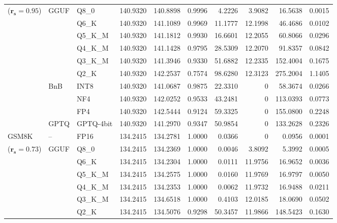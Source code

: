 \begin{table}[t]
{\begin{tabular}{ll l rrrrrrr}
{\small ($\mathbf{r_s{=}0.95}$)} & GGUF & Q8\_0 & 140.9320 & 140.8898 & 0.9996 & 4.2226 & 3.9082 & 16.5638 & 0.0015 \\
 &  & Q6\_K & 140.9320 & 141.1089 & 0.9969 & 11.1777 & 12.1998 & 46.4686 & 0.0102 \\
 &  & Q5\_K\_M & 140.9320 & 141.1812 & 0.9930 & 16.6601 & 12.2055 & 60.8066 & 0.0296 \\
 &  & Q4\_K\_M & 140.9320 & 141.1428 & 0.9795 & 28.5309 & 12.2070 & 91.8357 & 0.0842 \\
 &  & Q3\_K\_M & 140.9320 & 141.3946 & \cellcolor{red!18} 0.9330 & \cellcolor{red!18} 51.6882 & 12.2335 & \cellcolor{red!18} 152.4004 & \cellcolor{red!18} 0.1675 \\
 &  & Q2\_K & 140.9320 & 142.2537 & \cellcolor{red!35} 0.7574 & \cellcolor{red!35} 98.6280 & 12.3123 & \cellcolor{red!35} 275.2004 & \cellcolor{red!35} 1.1405 \\
 & BnB & INT8 & 140.9320 & 141.0687 & 0.9875 & 22.3310 & \cellcolor{cyan!12} $0$ & 58.3674 & 0.0266 \\
 &  & NF4 & 140.9320 & 142.0252 & 0.9533 & 43.2481 & \cellcolor{cyan!12} $0$ & 113.0393 & 0.0773 \\
 &  & FP4 & 140.9320 & 142.5444 & \cellcolor{red!18} 0.9124 & \cellcolor{red!18} 59.3325 & \cellcolor{cyan!12} $0$ & \cellcolor{red!18} 155.0800 & \cellcolor{red!18} 0.2248 \\
 & GPTQ & GPTQ-4bit & 140.9320 & 141.2970 & \cellcolor{red!18} 0.9347 & \cellcolor{red!18} 50.9854 & \cellcolor{cyan!12} $0$ & \cellcolor{red!18} 133.2628 & \cellcolor{red!18} 0.2326 \\
\midrule
GSM8K & -- & FP16 & 134.2415 & 134.2781 & 1.0000 & 0.0366 & \cellcolor{cyan!12} $0$ & 0.0956 & 0.0001 \\
{\small ($\mathbf{r_s{=}0.73}$)} & GGUF & Q8\_0 & 134.2415 & 134.2369 & 1.0000 & 0.0046 & 3.8092 & 5.3992 & 0.0005 \\
 &  & Q6\_K & 134.2415 & 134.2304 & 1.0000 & 0.0111 & 11.9756 & 16.9652 & 0.0036 \\
 &  & Q5\_K\_M & 134.2415 & 134.2575 & 1.0000 & 0.0160 & 11.9769 & 16.9797 & 0.0050 \\
 &  & Q4\_K\_M & 134.2415 & 134.2353 & 1.0000 & 0.0062 & 11.9732 & 16.9488 & 0.0211 \\
 &  & Q3\_K\_M & 134.2415 & 134.6518 & 1.0000 & 0.4103 & 12.0185 & 18.0690 & 0.0502 \\
 &  & Q2\_K & 134.2415 & 134.5076 & \cellcolor{red!18} 0.9298 & \cellcolor{red!18} 50.3457 & 11.9866 & \cellcolor{red!18} 148.5423 & \cellcolor{red!18} 0.1630 \\

\end{tabular}}
\end{table}
